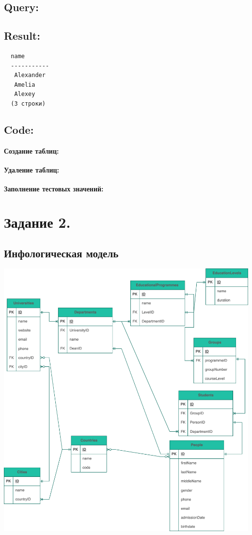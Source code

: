 \documentclass[12pt,onecolumn]{article}
\begin{document}
\subsection{Query:}

\subsection{Result:}
\begin{verbatim}
  name
  -----------
   Alexander
   Amelia
   Alexey
  (3 строки)
\end{verbatim}
\subsection{Code:}
\paragraph*{Создание таблиц:}

\paragraph*{Удаление таблиц:}

\paragraph*{Заполнение тестовых значений:}

\section{Задание 2.}
\subsection{Инфологическая модель}
\includegraphics[width=\textwidth]{image/dop-2-infological-model.png}
\end{document}
